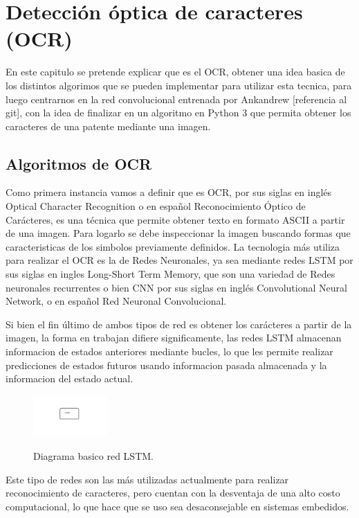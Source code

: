 \chapter{Detección óptica de caracteres (OCR)}
En este capitulo se pretende explicar que es el OCR, obtener una idea basica
de los distintos algorimos que se pueden implementar para
utilizar esta tecnica, para luego centrarnos en la red convolucional entrenada por
Ankandrew [referencia al git], con la idea de finalizar en un algoritmo en Python 3
que permita obtener los caracteres de una patente mediante una imagen.

\section{Algoritmos de OCR}
Como primera instancia vamos a definir que es OCR, por sus siglas en inglés Optical Character
Recognition o en español Reconocimiento Óptico de Carácteres, es una técnica que permite
obtener texto en formato ASCII a partir de una imagen.
Para logarlo se debe inspeccionar la imagen buscando formas que caracteristicas de los simbolos previamente definidos.
La tecnologia más utiliza para realizar el OCR es la de Redes Neuronales, ya sea
mediante redes LSTM por sus siglas en ingles Long-Short Term Memory, que son una variedad de Redes
neuronales recurrentes o bien CNN por sus siglas en inglés Convolutional Neural Network, o en español Red
Neuronal Convolucional.

Si bien el fin último de ambos tipos de red es obtener los carácteres a partir de la imagen, la forma en
trabajan difiere significamente, las redes LSTM almacenan informacion de estados anteriores mediante bucles,
lo que les permite realizar predicciones de estados futuros usando informacion pasada almacenada y la informacion
del estado actual.
\begin{figure}[h]
    \centering
    \includegraphics[width=0.25\textwidth]{imgs/LSTM-diagrama.jpg}
    \label{fig:diagrama-LSTM}
    \caption{Diagrama basico red LSTM.}
\end{figure}

Este tipo de redes son las más utilizadas actualmente para realizar reconocimiento de caracteres, pero cuentan con la desventaja de una alto costo computacional, lo que hace que se uso sea desaconsejable en sistemas embedidos.


